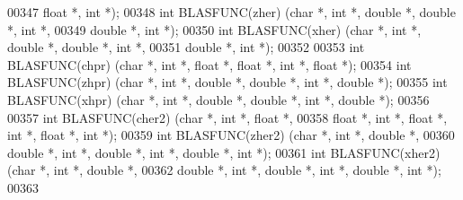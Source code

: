 \begin{DoxyCode}
00347             \textcolor{keywordtype}{float}  *, \textcolor{keywordtype}{int} *);
00348 \textcolor{keywordtype}{int} BLASFUNC(zher) (\textcolor{keywordtype}{char} *, \textcolor{keywordtype}{int} *, \textcolor{keywordtype}{double}  *, \textcolor{keywordtype}{double} *, \textcolor{keywordtype}{int} *,
00349             \textcolor{keywordtype}{double} *, \textcolor{keywordtype}{int} *);
00350 \textcolor{keywordtype}{int} BLASFUNC(xher) (\textcolor{keywordtype}{char} *, \textcolor{keywordtype}{int} *, \textcolor{keywordtype}{double}  *, \textcolor{keywordtype}{double} *, \textcolor{keywordtype}{int} *,
00351             \textcolor{keywordtype}{double} *, \textcolor{keywordtype}{int} *);
00352 
00353 \textcolor{keywordtype}{int} BLASFUNC(chpr) (\textcolor{keywordtype}{char} *, \textcolor{keywordtype}{int} *, \textcolor{keywordtype}{float}   *, \textcolor{keywordtype}{float}  *, \textcolor{keywordtype}{int} *, \textcolor{keywordtype}{float}  *);
00354 \textcolor{keywordtype}{int} BLASFUNC(zhpr) (\textcolor{keywordtype}{char} *, \textcolor{keywordtype}{int} *, \textcolor{keywordtype}{double}  *, \textcolor{keywordtype}{double} *, \textcolor{keywordtype}{int} *, \textcolor{keywordtype}{double} *);
00355 \textcolor{keywordtype}{int} BLASFUNC(xhpr) (\textcolor{keywordtype}{char} *, \textcolor{keywordtype}{int} *, \textcolor{keywordtype}{double}  *, \textcolor{keywordtype}{double} *, \textcolor{keywordtype}{int} *, \textcolor{keywordtype}{double} *);
00356 
00357 \textcolor{keywordtype}{int} BLASFUNC(cher2) (\textcolor{keywordtype}{char} *, \textcolor{keywordtype}{int} *, \textcolor{keywordtype}{float}   *,
00358              \textcolor{keywordtype}{float}  *, \textcolor{keywordtype}{int} *, \textcolor{keywordtype}{float}  *, \textcolor{keywordtype}{int} *, \textcolor{keywordtype}{float}  *, \textcolor{keywordtype}{int} *);
00359 \textcolor{keywordtype}{int} BLASFUNC(zher2) (\textcolor{keywordtype}{char} *, \textcolor{keywordtype}{int} *, \textcolor{keywordtype}{double}  *,
00360              \textcolor{keywordtype}{double} *, \textcolor{keywordtype}{int} *, \textcolor{keywordtype}{double} *, \textcolor{keywordtype}{int} *, \textcolor{keywordtype}{double} *, \textcolor{keywordtype}{int} *);
00361 \textcolor{keywordtype}{int} BLASFUNC(xher2) (\textcolor{keywordtype}{char} *, \textcolor{keywordtype}{int} *, \textcolor{keywordtype}{double}  *,
00362              \textcolor{keywordtype}{double} *, \textcolor{keywordtype}{int} *, \textcolor{keywordtype}{double} *, \textcolor{keywordtype}{int} *, \textcolor{keywordtype}{double} *, \textcolor{keywordtype}{int} *);
00363 

\end{DoxyCode}
